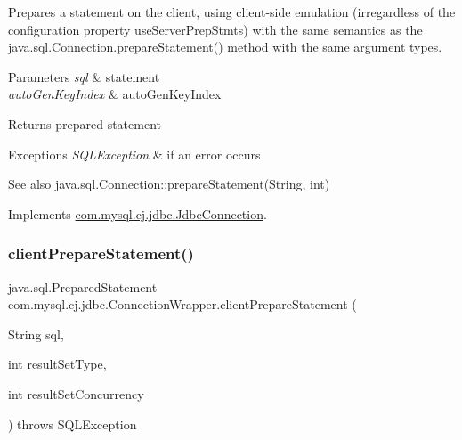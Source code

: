 Prepares a statement on the client, using client-\/side emulation (irregardless of the configuration property \textquotesingle{}use\+Server\+Prep\+Stmts\textquotesingle{}) with the same semantics as the java.\+sql.\+Connection.\+prepare\+Statement() method with the same argument types.


\begin{DoxyParams}{Parameters}
{\em sql} & statement \\
\hline
{\em auto\+Gen\+Key\+Index} & auto\+Gen\+Key\+Index \\
\hline
\end{DoxyParams}
\begin{DoxyReturn}{Returns}
prepared statement 
\end{DoxyReturn}

\begin{DoxyExceptions}{Exceptions}
{\em S\+Q\+L\+Exception} & if an error occurs \\
\hline
\end{DoxyExceptions}
\begin{DoxySeeAlso}{See also}
java.\+sql.\+Connection\+::prepare\+Statement(\+String, int) 
\end{DoxySeeAlso}


Implements \mbox{\hyperlink{interfacecom_1_1mysql_1_1cj_1_1jdbc_1_1_jdbc_connection_a1d01e4f2fd60084794906cc9a1c24c24}{com.\+mysql.\+cj.\+jdbc.\+Jdbc\+Connection}}.

\mbox{\label{classcom_1_1mysql_1_1cj_1_1jdbc_1_1_connection_wrapper_ac83890b870c7881f93d8907216be47ee}} 
\subsubsection{\texorpdfstring{client\+Prepare\+Statement()}{clientPrepareStatement()}\hspace{0.1cm}{\footnotesize\ttfamily [3/6]}}
{\footnotesize\ttfamily java.\+sql.\+Prepared\+Statement com.\+mysql.\+cj.\+jdbc.\+Connection\+Wrapper.\+client\+Prepare\+Statement (\begin{DoxyParamCaption}\item[{String}]{sql,  }\item[{int}]{result\+Set\+Type,  }\item[{int}]{result\+Set\+Concurrency }\end{DoxyParamCaption}) throws S\+Q\+L\+Exception}

